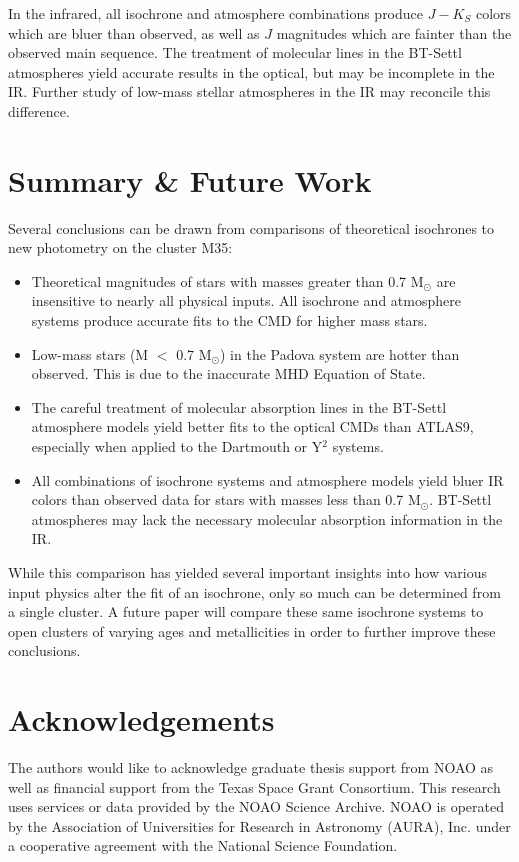 \documentclass[iop]{emulateapj}
\begin{document}
In the infrared, all isochrone and atmosphere combinations produce $J-K_S$ colors which are bluer than observed, as well as $J$ magnitudes which are fainter than the observed main sequence.  The treatment of molecular lines in the BT-Settl atmospheres yield accurate results in the optical, but may be incomplete in the IR. Further study of low-mass stellar atmospheres in the IR may reconcile this difference.



\section{Summary \& Future Work}

Several conclusions can be drawn from comparisons of theoretical isochrones to new photometry on the cluster M35:

\begin{itemize}
\item Theoretical magnitudes of stars with masses greater than 0.7 M$_\odot$ are insensitive to nearly all physical inputs. All isochrone and atmosphere systems produce accurate fits to the CMD for higher mass stars.
\item Low-mass stars (M $<$ 0.7 M$_\odot$) in the Padova system are hotter than observed. This is due to the inaccurate MHD Equation of State.
\item The careful treatment of molecular absorption lines in the BT-Settl atmosphere models yield better fits to the optical CMDs than ATLAS9, especially when applied to the Dartmouth or Y$^2$ systems.
\item All combinations of isochrone systems and atmosphere models yield bluer IR colors than observed data for stars with masses less than 0.7 M$_\odot$. BT-Settl atmospheres may lack the necessary molecular absorption information in the IR.
\end{itemize}

While this comparison has yielded several important insights into how various input physics alter the fit of an isochrone, only so much can be determined from a single cluster. A future paper will compare these same isochrone systems to open clusters of varying ages and metallicities in order to further improve these conclusions.


\section{Acknowledgements}

The authors would like to acknowledge graduate thesis support from NOAO as well as financial support from the Texas Space Grant Consortium. This research uses services or data provided by the NOAO Science Archive. NOAO is operated by the Association of Universities for Research in Astronomy (AURA), Inc. under a cooperative agreement with the National Science Foundation.





\end{document}
